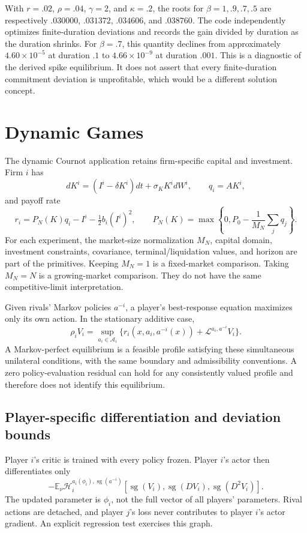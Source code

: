 \documentclass[ecta,draft]{econsocart}
\theoremstyle{definition}
\theoremstyle{remark}
\newcommand{\E}{\mathbb E}
\newcommand{\HH}{\mathcal H}
\newcommand{\LL}{\mathcal L}
\newcommand{\Act}{\mathcal A}
\newcommand{\sg}{\operatorname{sg}}
\begin{document}
With $r=.02$, $\rho=.04$, $\gamma=2$, and $\kappa=.2$, the roots for $\beta=1,.9,.7,.5$ are respectively $.030000$, $.031372$, $.034606$, and $.038760$. The code independently optimizes finite-duration deviations and records the gain divided by duration as the duration shrinks. For $\beta=.7$, this quantity declines from approximately $4.60\times10^{-5}$ at duration $.1$ to $4.66\times10^{-9}$ at duration $.001$. This is a diagnostic of the derived spike equilibrium. It does not assert that every finite-duration commitment deviation is unprofitable, which would be a different solution concept.

\section{Dynamic Games}\label{sec:games}
The dynamic Cournot application retains firm-specific capital and investment. Firm $i$ has
\[
 dK^i=(I^i-\delta K^i)dt+\sigma_K K^i dW^i,\qquad q_i=AK^i,
\]
and payoff rate
\[
 r_i=P_N(K)q_i-I^i-\tfrac12 b_i(I^i)^2,\qquad
 P_N(K)=\max\left\{0,P_0-\frac1{M_N}\sum_jq_j\right\}.
\]
For each experiment, the market-size normalization $M_N$, capital domain, investment constraints, covariance, terminal/liquidation values, and horizon are part of the primitives. Keeping $M_N=1$ is a fixed-market comparison. Taking $M_N=N$ is a growing-market comparison. They do not have the same competitive-limit interpretation.

Given rivals' Markov policies $a^{-i}$, a player's best-response equation maximizes only its own action. In the stationary additive case,
\begin{equation}\label{eq:game}
 \rho_i V_i=\sup_{a_i\in\Act_i}\{r_i(x,a_i,a^{-i}(x))+\LL^{a_i,a^{-i}}V_i\}.
\end{equation}
A Markov-perfect equilibrium is a feasible profile satisfying these simultaneous unilateral conditions, with the same boundary and admissibility conventions. A zero policy-evaluation residual can hold for any consistently valued profile and therefore does not identify this equilibrium.

\subsection{Player-specific differentiation and deviation bounds}
Player $i$'s critic is trained with every policy frozen. Player $i$'s actor then differentiates only
\begin{equation}\label{eq:gameactor}
 -\E_\nu\HH_i^{a_i(\phi_i),\sg(a^{-i})}
       [\sg(V_i),\sg(DV_i),\sg(D^2V_i)].
\end{equation}
The updated parameter is $\phi_i$, not the full vector of all players' parameters. Rival actions are detached, and player $j$'s loss never contributes to player $i$'s actor gradient. An explicit regression test exercises this graph.
\end{document}
